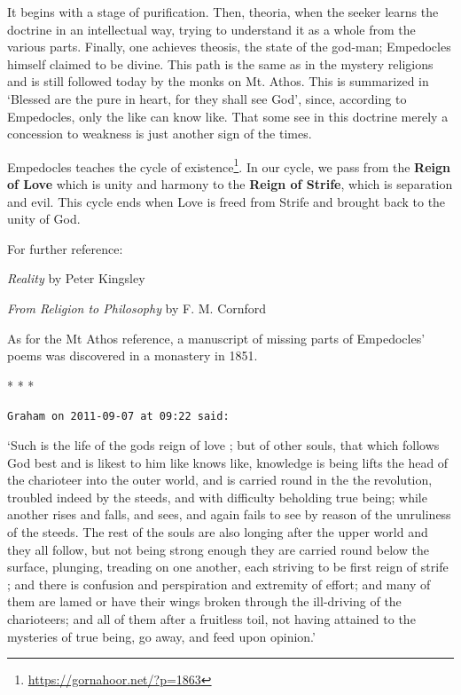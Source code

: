 It begins with a stage of purification. Then, theoria, when the seeker learns the doctrine in an intellectual way, trying to understand it as a whole from the various parts. Finally, one achieves theosis, the state of the god-man; Empedocles himself claimed to be divine. This path is the same as in the mystery religions and is still followed today by the monks on Mt. Athos. This is summarized in `Blessed are the pure in heart, for they shall see God', since, according to Empedocles, only the like can know like. That some see in this doctrine merely a concession to weakness is just another sign of the times.

Empedocles teaches the cycle of existence\footnote{\url{https://gornahoor.net/?p=1863}}. In our cycle, we pass from the \textbf{Reign of Love} which is unity and harmony to the \textbf{Reign of Strife}, which is separation and evil. This cycle ends when Love is freed from Strife and brought back to the unity of God.

For further reference:

\emph{Reality} by Peter Kingsley

\emph{From Religion to Philosophy} by F. M. Cornford

As for the Mt Athos reference, a manuscript of missing parts of Empedocles' poems was discovered in a monastery in 1851.



\begin{center}* * *\end{center}

\begin{footnotesize}
\begin{sffamily}
\texttt{Graham on 2011-09-07 at 09:22 said:}

`Such is the life of the gods reign of love ; but of other souls, that which follows God best and is likest to him like knows like, knowledge is being lifts the head of the charioteer into the outer world, and is carried round in the the revolution, troubled indeed by the steeds, and with difficulty beholding true being; while another rises and falls, and sees, and again fails to see by reason of the unruliness of the steeds. The rest of the souls are also longing after the upper world and they all follow, but not being strong enough they are carried round below the surface, plunging, treading on one another, each striving to be first reign of strife ; and there is confusion and perspiration and extremity of effort; and many of them are lamed or have their wings broken through the ill-driving of the charioteers; and all of them after a fruitless toil, not having attained to the mysteries of true being, go away, and feed upon opinion.'


\hfill

\end{sffamily}
\end{footnotesize}

